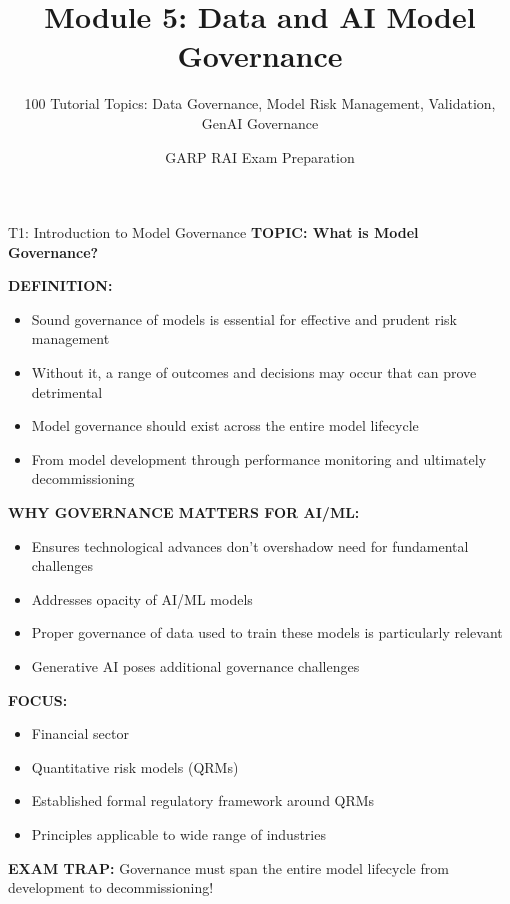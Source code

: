 \documentclass[8pt]{beamer}
\title{Module 5: Data and AI Model Governance}
\subtitle{100 Tutorial Topics: Data Governance, Model Risk Management, Validation, GenAI Governance}
\author{GARP RAI Exam Preparation}
\date{}
\begin{document}
	
	\begin{frame}
		\titlepage
	\end{frame}
	
	
	\begin{frame}{T1: Introduction to Model Governance}
		\fontsize{6.5}{7.5}\selectfont
		\textbf{TOPIC: What is Model Governance?}
		
		\vspace{0.1cm}
		\textbf{DEFINITION:}
		\begin{itemize}
			\item Sound governance of models is essential for effective and prudent risk management
			\item Without it, a range of outcomes and decisions may occur that can prove detrimental
			\item Model governance should exist across the entire model lifecycle
			\item From model development through performance monitoring and ultimately decommissioning
		\end{itemize}
		
		\vspace{0.1cm}
		\textbf{WHY GOVERNANCE MATTERS FOR AI/ML:}
		\begin{itemize}
			\item Ensures technological advances don't overshadow need for fundamental challenges
			\item Addresses opacity of AI/ML models
			\item Proper governance of data used to train these models is particularly relevant
			\item Generative AI poses additional governance challenges
		\end{itemize}
		
		\vspace{0.1cm}
		\textbf{FOCUS:}
		\begin{itemize}
			\item Financial sector
			\item Quantitative risk models (QRMs)
			\item Established formal regulatory framework around QRMs
			\item Principles applicable to wide range of industries
		\end{itemize}
		
		\textcolor{myred}{\textbf{EXAM TRAP:}} Governance must span \textcolor{myblue}{the entire model lifecycle} from development to decommissioning!
	\end{frame}
	
\end{document}
